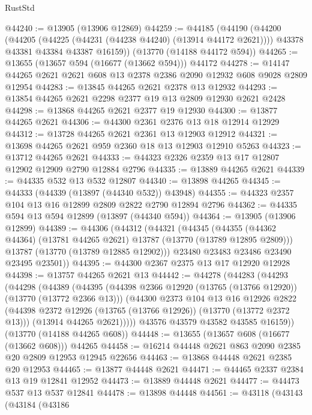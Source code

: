 \begin{lexlean}{RustStd}
\begin{coremodule}
@44240 := @13905 (@13906 @12869)
@44259 := @44185
    (@44190
      (@44200
        (@44205 (@44225 (@44231 (@44238 @44240) (@13914 @44172 @2621))))
        @43378
        @43381
        @43384
        @43387
        @16159))
    (@13770 (@14188 @44172 @594))
@44265 := @13655 (@13657 @594 (@16677 (@13662 @594))) @44172
@44278 := @14147 @44265 @2621 @2621 @608 @13 @2378 @2386 @2090 @12932 @608 @9028 @2809 @12954
@44283 := @13845 @44265 @2621 @2378 @13 @12932
@44293 := @13854 @44265 @2621 @2298 @2377 @19 @13 @2809 @12930 @2621 @2428
@44298 := @13868 @44265 @2621 @2377 @19 @12930
@44300 := @13877 @44265 @2621
@44306 := @44300 @2361 @2376 @13 @18 @12914 @12929
@44312 := @13728 @44265 @2621 @2361 @13 @12903 @12912
@44321 := @13698 @44265 @2621 @959 @2360 @18 @13 @12903 @12910 @5263
@44323 := @13712 @44265 @2621
@44333 := @44323 @2326 @2359 @13 @17 @12807 @12902 @12909 @2790 @12884 @2796
@44335 := @13889 @44265 @2621
@44339 := @44335 @532 @13 @532 @12807
@44340 := @13898 @44265
@44345 := @44333 (@44339 (@13897 (@44340 @532)) @43948)
@44355 := @44323 @2357 @104 @13 @16 @12899 @2809 @2822 @2790 @12894 @2796
@44362 := @44335 @594 @13 @594 @12899 (@13897 (@44340 @594))
@44364 := @13905 (@13906 @12899)
@44389 := @44306
    (@44312
      (@44321
        (@44345
          (@44355 (@44362 @44364) (@13781 @44265 @2621) @13787 (@13770 (@13789 @12895 @2809)))
          @13787
          (@13770 (@13789 @12885 @12902)))
        @23480
        @23483
        @23486
        @23490
        @23495
        @23501))
@44395 := @44300 @2367 @2375 @13 @17 @12920 @12928
@44398 := @13757 @44265 @2621 @13
@44442 := @44278
    (@44283
      (@44293
        (@44298
          (@44389
            (@44395
              (@44398 @2366 @12920 (@13765 (@13766 @12920)) (@13770 (@13772 @2366 @13)))
              (@44300
                @2373
                @104
                @13
                @16
                @12926
                @2822
                (@44398 @2372 @12926 (@13765 (@13766 @12926)) (@13770 (@13772 @2372 @13)))
                (@13914 @44265 @2621)))))
        @43576
        @43579
        @43582
        @43585
        @16159))
    (@13770 (@14188 @44265 @608))
@44448 := @13655 (@13657 @608 (@16677 (@13662 @608))) @44265
@44458 := @16214 @44448 @2621 @863 @2090 @2385 @20 @2809 @12953 @12945 @22656
@44463 := @13868 @44448 @2621 @2385 @20 @12953
@44465 := @13877 @44448 @2621
@44471 := @44465 @2337 @2384 @13 @19 @12841 @12952
@44473 := @13889 @44448 @2621
@44477 := @44473 @537 @13 @537 @12841
@44478 := @13898 @44448
@44561 := @43118
    (@43143
      (@43184
        (@43186

\end{coremodule}
\end{lexlean}
